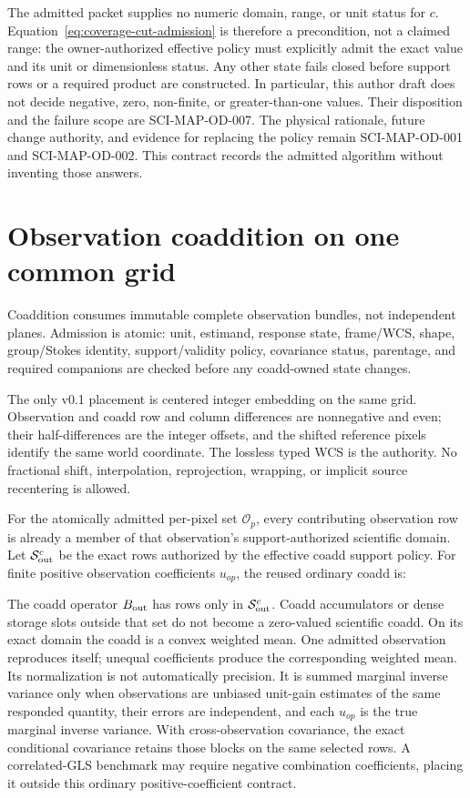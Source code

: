 \documentclass[10pt]{article}
\begin{document}
The admitted packet supplies no numeric domain, range, or unit status for
\(c\). Equation~\eqref{eq:coverage-cut-admission} is therefore a precondition,
not a claimed range: the owner-authorized effective policy must explicitly
admit the exact value and its unit or dimensionless status. Any other state
fails closed before support rows or a required product are constructed. In
particular, this author draft does not decide negative, zero, non-finite, or
greater-than-one values. Their disposition and the failure scope are
SCI-MAP-OD-007. The physical rationale, future change authority, and evidence
for replacing the policy remain SCI-MAP-OD-001 and SCI-MAP-OD-002. This
contract records the admitted algorithm without inventing those answers.

\clearpage
\section{Observation coaddition on one common grid}

Coaddition consumes immutable complete observation bundles, not independent
planes. Admission is atomic: unit, estimand, response state, frame/WCS, shape,
group/Stokes identity, support/validity policy, covariance status, parentage,
and required companions are checked before any coadd-owned state changes.

The only v0.1 placement is centered integer embedding on the same grid.
Observation and coadd row and column differences are nonnegative and even;
their half-differences are the integer offsets, and the shifted reference
pixels identify the same world coordinate. The lossless typed WCS is the
authority. No fractional shift, interpolation, reprojection, wrapping, or
implicit source recentering is allowed.

For the atomically admitted per-pixel set \(\mathcal O_p\), every contributing
observation row is already a member of that observation's support-authorized
scientific domain. Let \(\mathcal S^c_{\rm out}\) be the exact rows authorized
by the effective coadd support policy. For finite positive observation
coefficients \(u_{op}\), the reused ordinary coadd is:

\SCIMapCoaddEquations

The coadd operator \(B_{\rm out}\) has rows only in
\(\mathcal S^c_{\rm out}\). Coadd accumulators or dense storage slots outside
that set do not become a zero-valued scientific coadd. On its exact domain the
coadd is a convex weighted mean. One admitted observation reproduces itself;
unequal coefficients produce the corresponding weighted mean. Its
normalization is not automatically precision. It is summed marginal inverse
variance only when observations are unbiased unit-gain estimates of the same
responded quantity, their errors are independent, and each \(u_{op}\) is the
true marginal inverse variance. With cross-observation covariance, the exact
conditional covariance retains those blocks on the same selected rows. A
correlated-GLS benchmark may require negative combination coefficients,
placing it outside this ordinary positive-coefficient contract.
\end{document}
